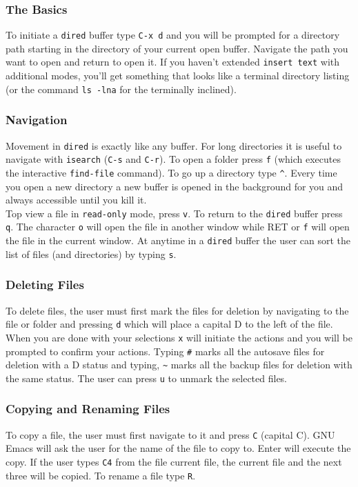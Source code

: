 \documentclass[12pt,a4paper,oneside]{article}
\begin{document}
\subsubsection{The Basics}
To initiate a \texttt{dired} buffer type \texttt{C-x d} and you will be prompted for a directory path starting in the directory of your current open buffer. Navigate the path you want to open and return to open it. If you haven't extended \texttt{insert text} with additional modes, you'll get something that looks like a terminal directory listing (or the command \texttt{ls -lna} for the terminally inclined).

\subsubsection{Navigation}
Movement in \texttt{dired} is exactly like any buffer. For long directories it is useful to navigate with \texttt{isearch} (\texttt{C-s} and \texttt{C-r}). To open a folder press \texttt{f} (which executes the interactive \texttt{find-file} command). To go up a directory type \texttt{\^}. Every time you open a new directory a new buffer is opened in the background for you and always accessible until you kill it.\\

Top view a file in \texttt{read-only} mode, press \texttt{v}. To return to the \texttt{dired} buffer press \texttt{q}. The character \texttt{o} will open the file in another window while RET or \texttt{f} will open the file in the current window. At anytime in a \texttt{dired} buffer the user can sort the list of files (and directories) by typing \texttt{s}.

\subsubsection{Deleting Files}
To delete files, the user must first mark the files for deletion by navigating to the file or folder and pressing \texttt{d} which will place a capital D to the left of the file. When you are done with your selections \texttt{x} will initiate the actions and you will be prompted to confirm your actions. Typing \texttt{#} marks all the autosave files for deletion with a D status and typing, \texttt{\~} marks all the backup files for deletion with the same status. The user can press \texttt{u} to unmark the selected files.

\subsubsection{Copying and Renaming Files}
To copy a file, the user must first navigate to it and press \texttt{C} (capital C). GNU Emacs will ask the user for the name of the file to copy to. Enter will execute the copy. If the user types \texttt{C4} from the file current file, the current file and the next three will be copied. To rename a file type \texttt{R}.\\
\end{document}

